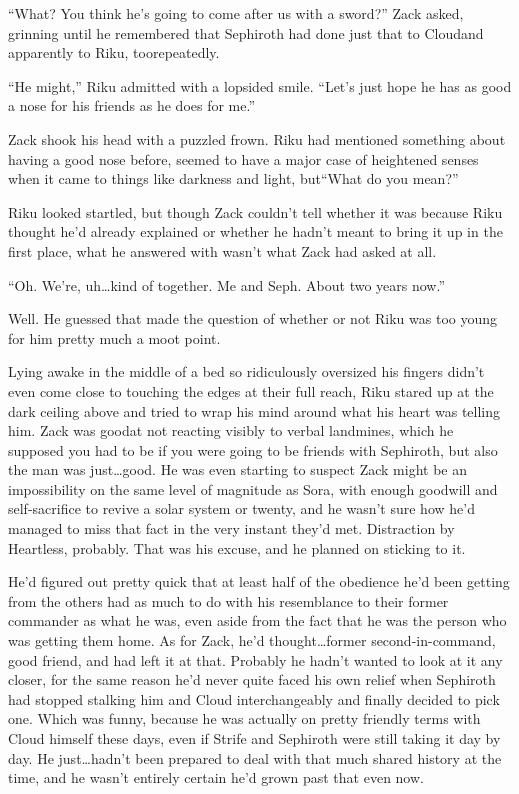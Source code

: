 ``What? You think he's going to come after us with a sword?'' Zack asked, grinning until he remembered that Sephiroth had done just that to Cloud\textemdash and apparently to Riku, too\textemdash repeatedly.

``He might,'' Riku admitted with a lopsided smile. ``Let's just hope he has as good a nose for his friends as he does for me.''

Zack shook his head with a puzzled frown. Riku had mentioned something about having a good nose before, seemed to have a major case of heightened senses when it came to things like darkness and light, but\textemdash  ``What do you mean?''

Riku looked startled, but though Zack couldn't tell whether it was because Riku thought he'd already explained or whether he hadn't meant to bring it up in the first place, what he answered with wasn't what Zack had asked at all.

``Oh. We're, uh\ldots kind of together. Me and Seph. About two years now.''

Well. He guessed that made the question of whether or not Riku was too young for him pretty much a moot point.


\scenechange


Lying awake in the middle of a bed so ridiculously oversized his fingers didn't even come close to touching the edges at their full reach, Riku stared up at the dark ceiling above and tried to wrap his mind around what his heart was telling him. Zack was good\textemdash at not reacting visibly to verbal landmines, which he supposed you had to be if you were going to be friends with Sephiroth, but also the man was just\ldots good. He was even starting to suspect Zack might be an impossibility on the same level of magnitude as Sora, with enough goodwill and self-sacrifice to revive a solar system or twenty, and he wasn't sure how he'd managed to miss that fact in the very instant they'd met. Distraction by Heartless, probably. That was his excuse, and he planned on sticking to it.

He'd figured out pretty quick that at least half of the obedience he'd been getting from the others had as much to do with his resemblance to their former commander as what he was, even aside from the fact that he was the person who was getting them home. As for Zack, he'd thought\ldots former second-in-command, good friend, and had left it at that. Probably he hadn't wanted to look at it any closer, for the same reason he'd never quite faced his own relief when Sephiroth had stopped stalking him and Cloud interchangeably and finally decided to pick one. Which was funny, because he was actually on pretty friendly terms with Cloud himself these days, even if Strife and Sephiroth were still taking it day by day. He just\ldots hadn't been prepared to deal with that much shared history at the time, and he wasn't entirely certain he'd grown past that even now.

